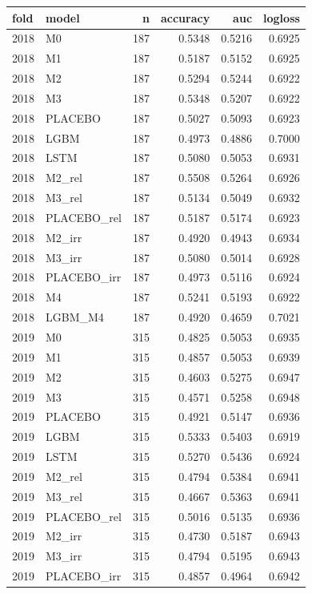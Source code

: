 \begin{tabular}{llrrrr}
\toprule
fold & model & n & accuracy & auc & logloss \\
\midrule
2018 & M0 & 187 & 0.5348 & 0.5216 & 0.6925 \\
2018 & M1 & 187 & 0.5187 & 0.5152 & 0.6925 \\
2018 & M2 & 187 & 0.5294 & 0.5244 & 0.6922 \\
2018 & M3 & 187 & 0.5348 & 0.5207 & 0.6922 \\
2018 & PLACEBO & 187 & 0.5027 & 0.5093 & 0.6923 \\
2018 & LGBM & 187 & 0.4973 & 0.4886 & 0.7000 \\
2018 & LSTM & 187 & 0.5080 & 0.5053 & 0.6931 \\
2018 & M2\_rel & 187 & 0.5508 & 0.5264 & 0.6926 \\
2018 & M3\_rel & 187 & 0.5134 & 0.5049 & 0.6932 \\
2018 & PLACEBO\_rel & 187 & 0.5187 & 0.5174 & 0.6923 \\
2018 & M2\_irr & 187 & 0.4920 & 0.4943 & 0.6934 \\
2018 & M3\_irr & 187 & 0.5080 & 0.5014 & 0.6928 \\
2018 & PLACEBO\_irr & 187 & 0.4973 & 0.5116 & 0.6924 \\
2018 & M4 & 187 & 0.5241 & 0.5193 & 0.6922 \\
2018 & LGBM\_M4 & 187 & 0.4920 & 0.4659 & 0.7021 \\
2019 & M0 & 315 & 0.4825 & 0.5053 & 0.6935 \\
2019 & M1 & 315 & 0.4857 & 0.5053 & 0.6939 \\
2019 & M2 & 315 & 0.4603 & 0.5275 & 0.6947 \\
2019 & M3 & 315 & 0.4571 & 0.5258 & 0.6948 \\
2019 & PLACEBO & 315 & 0.4921 & 0.5147 & 0.6936 \\
2019 & LGBM & 315 & 0.5333 & 0.5403 & 0.6919 \\
2019 & LSTM & 315 & 0.5270 & 0.5436 & 0.6924 \\
2019 & M2\_rel & 315 & 0.4794 & 0.5384 & 0.6941 \\
2019 & M3\_rel & 315 & 0.4667 & 0.5363 & 0.6941 \\
2019 & PLACEBO\_rel & 315 & 0.5016 & 0.5135 & 0.6936 \\
2019 & M2\_irr & 315 & 0.4730 & 0.5187 & 0.6943 \\
2019 & M3\_irr & 315 & 0.4794 & 0.5195 & 0.6943 \\
2019 & PLACEBO\_irr & 315 & 0.4857 & 0.4964 & 0.6942 \\

\end{tabular}
